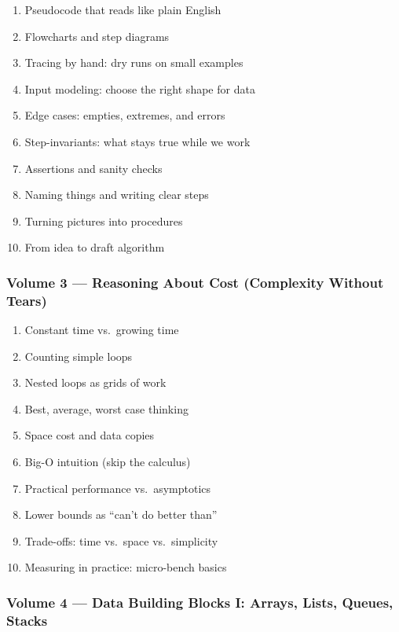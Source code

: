 \documentclass[
  letterpaper,
  DIV=11,
  numbers=noendperiod]{scrreprt}
\providecommand{\tightlist}{%
  \setlength{\itemsep}{0pt}\setlength{\parskip}{0pt}}
\begin{document}
\begin{enumerate}
\def\labelenumi{\arabic{enumi}.}
\setcounter{enumi}{10}
\tightlist
\item
  Pseudocode that reads like plain English
\item
  Flowcharts and step diagrams
\item
  Tracing by hand: dry runs on small examples
\item
  Input modeling: choose the right shape for data
\item
  Edge cases: empties, extremes, and errors
\item
  Step-invariants: what stays true while we work
\item
  Assertions and sanity checks
\item
  Naming things and writing clear steps
\item
  Turning pictures into procedures
\item
  From idea to draft algorithm
\end{enumerate}

\subsubsection{Volume 3 --- Reasoning About Cost (Complexity Without
Tears)}\label{volume-3-reasoning-about-cost-complexity-without-tears}

\begin{enumerate}
\def\labelenumi{\arabic{enumi}.}
\setcounter{enumi}{20}
\tightlist
\item
  Constant time vs.~growing time
\item
  Counting simple loops
\item
  Nested loops as grids of work
\item
  Best, average, worst case thinking
\item
  Space cost and data copies
\item
  Big-O intuition (skip the calculus)
\item
  Practical performance vs.~asymptotics
\item
  Lower bounds as ``can't do better than''
\item
  Trade-offs: time vs.~space vs.~simplicity
\item
  Measuring in practice: micro-bench basics
\end{enumerate}

\subsubsection{Volume 4 --- Data Building Blocks I: Arrays, Lists,
Queues,
Stacks}\label{volume-4-data-building-blocks-i-arrays-lists-queues-stacks}
\end{document}
